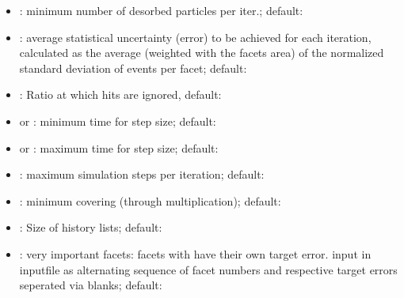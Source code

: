 \begin{itemize}[noitemsep,topsep=0pt, partopsep=0pt]
\item {}: minimum number of desorbed particles per iter.; default: 
\item {}: average statistical uncertainty (error) to be achieved for each iteration, calculated as the average (weighted with the facets area) of the normalized standard deviation of events per facet; default: 
\item {}: Ratio at which hits are ignored, default: 
\item {} or : minimum time for step size; default:
\item {} or : maximum time for step size; default:
\item {}: maximum simulation steps per iteration; default:
\item {}: minimum covering (through multiplication); default:
\item {}: Size of history lists; default:
\item {}: very important facets: facets with have their own target error. input in inputfile as alternating sequence of facet numbers and respective target errors seperated via blanks; default:\codew{[]}
\end{itemize}
\newpage
%
%

